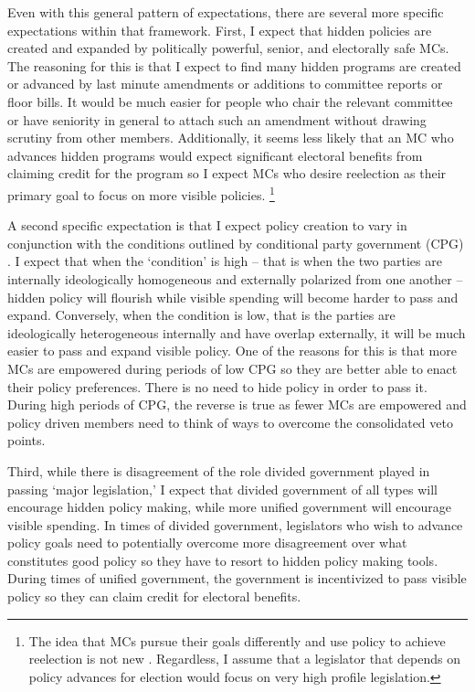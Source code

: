 \documentclass[12pt]{article}
\begin{document}
Even with this general pattern of expectations, there are several more specific expectations within that framework. First, I expect that hidden policies are created and expanded by politically powerful, senior, and electorally safe MCs. The reasoning for this is that I expect to find many hidden programs are created or advanced by last minute amendments or additions to committee reports or floor bills. It would be much easier for people who chair the relevant committee or have seniority in general to attach such an amendment without drawing scrutiny from other members. Additionally, it seems less likely that an MC who advances hidden programs would expect significant electoral benefits from claiming credit for the program so I expect MCs who desire reelection as their primary goal to focus on more visible policies. \footnote{
The idea that MCs pursue their goals differently and use policy to achieve reelection is not new \citep{fenno1973, kernell1999}. Regardless, I assume that a legislator that depends on policy advances for election would focus on very high profile legislation.} 

A second specific expectation is that I expect policy creation to vary in conjunction with the conditions outlined by conditional party government (CPG) \citep{rohde1991}. I expect that when the `condition' is high -- that is when the two parties are internally ideologically homogeneous and externally polarized from one another -- hidden policy will flourish while visible spending will become harder to pass and expand. Conversely, when the condition is low, that is the parties are ideologically heterogeneous internally and have overlap externally, it will be much easier to pass  and expand visible policy. One of the reasons for this is that more MCs are empowered during periods of low CPG so they are better able to enact their policy preferences. There is no need to hide policy in order to pass it. During high periods of CPG, the reverse is true as fewer MCs are empowered and policy driven members need to think of ways to overcome the consolidated veto points.

Third, while there is disagreement of the role divided government played in passing `major legislation,' I expect that divided government of all types will encourage hidden policy making, while more unified government will encourage visible spending. In times of divided government, legislators who wish to advance policy goals need to potentially overcome more disagreement over what constitutes good policy so they have to resort to hidden policy making tools. During times of unified government, the government is incentivized to pass visible policy so they can claim credit for electoral benefits.
\end{document}
